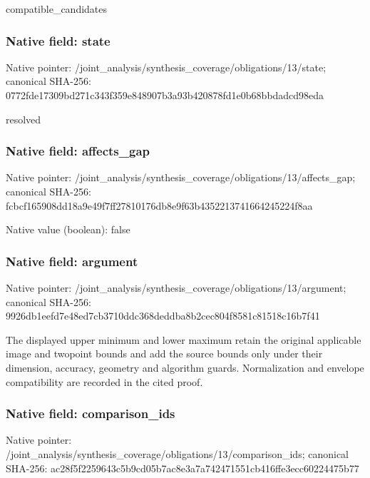 \documentclass[10pt,a4paper]{article}
\begin{document}
compatible\_candidates


\subsubsection{Native field: state}


Native pointer: /joint\_analysis/synthesi\allowbreak{}s\_coverage/obligations/1\allowbreak{}3/state; canonical SHA-256: 0772fde17309bd271c343f35\allowbreak{}9e848907b3a93b420878fd1e\allowbreak{}0b68bbdadcd98eda


resolved


\subsubsection{Native field: affects\_gap}


Native pointer: /joint\_analysis/synthesi\allowbreak{}s\_coverage/obligations/1\allowbreak{}3/affects\_gap; canonical SHA-256: fcbcf165908dd18a9e49f7ff\allowbreak{}27810176db8e9f63b4352213\allowbreak{}741664245224f8aa



Native value (boolean): false



\subsubsection{Native field: argument}


Native pointer: /joint\_analysis/synthesi\allowbreak{}s\_coverage/obligations/1\allowbreak{}3/argument; canonical SHA-256: 9926db1eefd7e48ed7cb3710\allowbreak{}ddc368deddba8b2cec804f85\allowbreak{}81c81518c16b7f41


The displayed upper minimum and lower maximum retain the original applicable image and twopoint bounds and add the source bounds only under their dimension, accuracy, geometry and algorithm guards. Normalization and envelope compatibility are recorded in the cited proof.


\subsubsection{Native field: comparison\_ids}


Native pointer: /joint\_analysis/synthesi\allowbreak{}s\_coverage/obligations/1\allowbreak{}3/comparison\_ids; canonical SHA-256: ac28f5f2259643c5b9cd05b7\allowbreak{}ac8e3a7a742471551cb416ff\allowbreak{}e3ecc60224475b77
\end{document}
